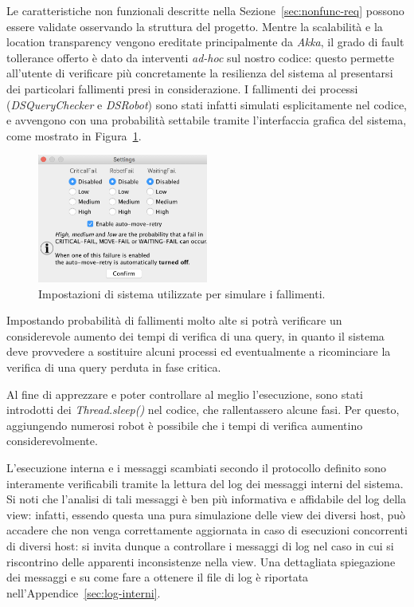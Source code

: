 Le caratteristiche non funzionali descritte nella Sezione~\ref{sec:nonfunc-req}
possono essere validate osservando la struttura del progetto.
Mentre la scalabilità e la location transparency vengono ereditate
principalmente da \emph{Akka},
il grado di fault tollerance offerto è dato da interventi \emph{ad-hoc}
sul nostro codice: questo permette all'utente di verificare più
concretamente la resilienza del sistema al presentarsi dei
particolari fallimenti presi in considerazione.
I fallimenti dei processi (\emph{DSQueryChecker} e \emph{DSRobot})
sono stati infatti simulati esplicitamente nel codice,
e avvengono con una probabilità settabile tramite l'interfaccia grafica
del sistema, come mostrato in Figura~\ref{fig:settings}.
\begin{figure}
	\centering
	\includegraphics[width=0.5\textwidth]{immagini/settings.png}
	\caption{\label{fig:settings}
        Impostazioni di sistema utilizzate per simulare i fallimenti.}
\end{figure}
Impostando probabilità di fallimenti molto alte si potrà verificare
un considerevole aumento dei tempi di verifica di una query,
in quanto il sistema deve provvedere a sostituire alcuni processi
ed eventualmente a ricominciare la verifica di una query perduta in
fase critica.

Al fine di apprezzare e poter controllare al meglio l'esecuzione,
sono stati introdotti dei \emph{Thread.sleep()} nel codice,
che rallentassero alcune fasi. Per questo, aggiungendo numerosi robot
è possibile che i tempi di verifica aumentino considerevolmente.

L'esecuzione interna e i messaggi scambiati secondo il protocollo
definito sono interamente verificabili tramite la lettura del
log dei messaggi interni del sistema.
Si noti che l'analisi di tali messaggi è ben più informativa e
affidabile del log della view: infatti, essendo questa una pura
simulazione delle view dei diversi host, può accadere che non venga
correttamente aggiornata in caso di esecuzioni concorrenti di
diversi host: si invita dunque a controllare i messaggi di log nel
caso in cui si riscontrino delle apparenti inconsistenze nella view.
Una dettagliata spiegazione dei messaggi e su come fare a ottenere
il file di log è riportata nell'Appendice~\ref{sec:log-interni}.

